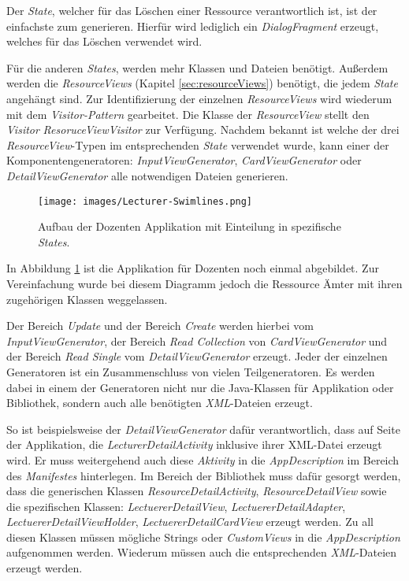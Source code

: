 Der \textit{State}, welcher für das Löschen einer Ressource verantwortlich ist, ist der einfachste zum generieren. Hierfür wird lediglich ein \textit{DialogFragment} erzeugt, welches für das Löschen verwendet wird. 

Für die anderen \textit{States}, werden mehr Klassen und Dateien benötigt. Außerdem werden die \textit{ResourceViews} (Kapitel \ref{sec:resourceViews}) benötigt, die jedem \textit{State} angehängt sind. Zur Identifizierung der einzelnen \textit{ResourceViews} wird wiederum mit dem \textit{Visitor-Pattern} gearbeitet. Die Klasse der \textit{ResourceView} stellt den \textit{Visitor} \textit{ResoruceViewVisitor} zur Verfügung. 
Nachdem bekannt ist welche der drei \textit{ResourceView}-Typen im entsprechenden \textit{State} verwendet wurde, kann einer der Komponentengeneratoren: \textit{InputViewGenerator}, \textit{CardViewGenerator} oder \textit{DetailViewGenerator} alle notwendigen Dateien generieren.

\begin{figure}[H]
	\begin{center}
		\texttt{[image: images/Lecturer-Swimlines.png]}
		\caption{Aufbau der Dozenten Applikation mit Einteilung in spezifische \textit{States}.}
		\label{fig:swimlines}
	\end{center}
\end{figure}

In Abbildung \ref{fig:swimlines} ist die Applikation für Dozenten noch einmal abgebildet. Zur Vereinfachung wurde bei diesem Diagramm jedoch die Ressource Ämter mit ihren zugehörigen Klassen weggelassen.

Der Bereich \textit{Update} und der Bereich \textit{Create} werden hierbei vom \textit{InputViewGenerator}, der Bereich \textit{Read Collection} von \textit{CardViewGenerator} und der Bereich \textit{Read Single} vom \textit{DetailViewGenerator} erzeugt.
Jeder der einzelnen Generatoren ist ein Zusammenschluss von vielen Teilgeneratoren. Es werden dabei in einem der Generatoren nicht nur die Java-Klassen für Applikation oder Bibliothek, sondern auch alle benötigten \textit{XML}-Dateien erzeugt.

\newpage

So ist beispielsweise der \textit{DetailViewGenerator} dafür verantwortlich, dass auf Seite der Applikation, die \textit{LecturerDetailActivity} inklusive ihrer XML-Datei erzeugt wird. Er muss weitergehend auch diese \textit{Aktivity} in die \textit{AppDescription} im Bereich des \textit{Manifestes} hinterlegen. Im Bereich der Bibliothek muss dafür gesorgt werden, dass die generischen Klassen \textit{ResourceDetailActivity}, \textit{ResourceDetailView} sowie die spezifischen Klassen: \textit{LectuererDetailView}, \textit{LectuererDetailAdapter}, \textit{LectuererDetailViewHolder}, \textit{LectuererDetailCardView} erzeugt werden. Zu all diesen Klassen müssen mögliche Strings oder \textit{CustomViews} in die \textit{AppDescription} aufgenommen werden. Wiederum müssen auch die entsprechenden \textit{XML}-Dateien erzeugt werden. 

